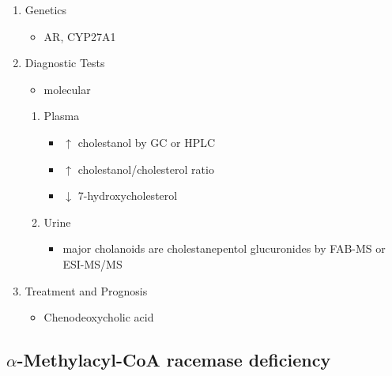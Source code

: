 \documentclass{scrartcl}
\begin{document}
\begin{enumerate}
\item Genetics
\label{sec:org6f50437}
\begin{itemize}
\item AR, CYP27A1
\end{itemize}

\item Diagnostic Tests
\label{sec:org49a48d8}
\begin{itemize}
\item molecular
\end{itemize}
\begin{enumerate}
\item Plasma
\label{sec:orgd5e838b}
\begin{itemize}
\item \(\uparrow\) cholestanol by GC or HPLC
\item \(\uparrow\) cholestanol/cholesterol ratio
\item \(\downarrow\) 7-hydroxycholesterol
\end{itemize}
\item Urine
\label{sec:org4d8a158}
\begin{itemize}
\item major cholanoids are cholestanepentol glucuronides by FAB-MS or ESI-MS/MS
\end{itemize}
\end{enumerate}

\item Treatment and Prognosis
\label{sec:org89ba4fc}
\begin{itemize}
\item Chenodeoxycholic acid
\end{itemize}
\end{enumerate}
\subsection{\(\alpha\)-Methylacyl-CoA racemase deficiency}
\label{sec:orgf229163}
\end{document}
